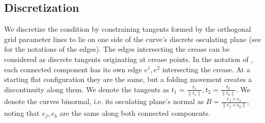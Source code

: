 
\subsection{Discretization}
We discretize the condition by constraining tangents formed by the orthogonal grid parameter lines to lie on one side of the curve's discrete osculating plane (see  for the notations of the edges). The edges intersecting the crease can be considered as discrete tangents originating at crease points. In the notation of , each connected component has its own edge $e^1,e^2$ intersecting the crease. At a starting flat configuration they are the same, but a folding movement creates a discontinuity along them. We denote the tangents as $t_1 = \frac{t_1}{\|t_1\|}, t_2 = \frac{t_2}{\|t_2\|}$. We denote the curves binormal, i.e. its osculating plane's normal as $B = \frac{e_f \times e_b}{\|e_f \times e_b\|}$, noting that $e_f,e_b$ are the same along both connected components.

